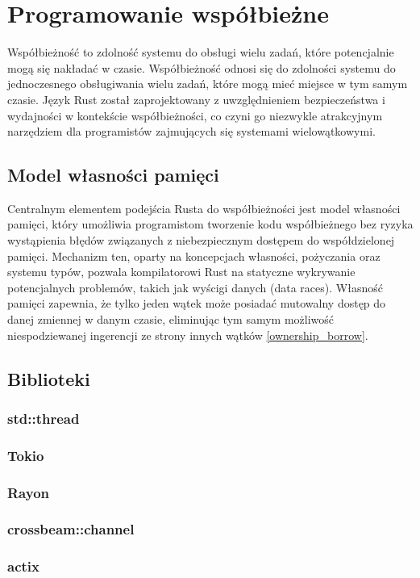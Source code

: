 \section{Programowanie współbieżne}
Współbieżność to zdolność systemu do obsługi wielu zadań, które potencjalnie mogą się nakładać w czasie. Współbieżność odnosi się do zdolności systemu do jednoczesnego obsługiwania wielu zadań, które mogą mieć miejsce w tym samym czasie. Język Rust został zaprojektowany z uwzględnieniem bezpieczeństwa i wydajności w kontekście współbieżności, co czyni go niezwykle atrakcyjnym narzędziem dla programistów zajmujących się systemami wielowątkowymi.

\subsection{Model własności pamięci}
Centralnym elementem podejścia Rusta do współbieżności jest model własności pamięci, który umożliwia programistom tworzenie kodu współbieżnego bez ryzyka wystąpienia błędów związanych z niebezpiecznym dostępem do współdzielonej pamięci. Mechanizm ten, oparty na koncepcjach własności, pożyczania oraz systemu typów, pozwala kompilatorowi Rust na statyczne wykrywanie potencjalnych problemów, takich jak wyścigi danych (data races). Własność pamięci zapewnia, że tylko jeden wątek może posiadać mutowalny dostęp do danej zmiennej w danym czasie, eliminując tym samym możliwość niespodziewanej ingerencji ze strony innych wątków \ref{ownership_borrow}.

\subsection{Biblioteki}
\subsubsection{std::thread}
\subsubsection{Tokio}
\subsubsection{Rayon}
\subsubsection{crossbeam::channel}
\subsubsection{actix}

